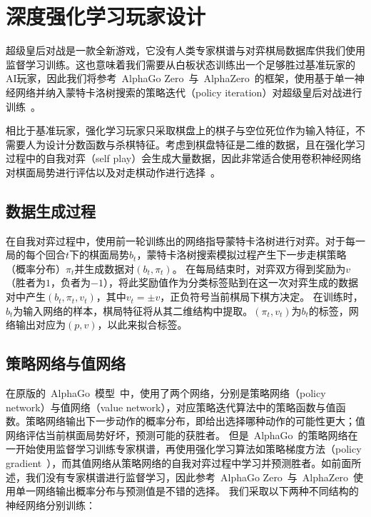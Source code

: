 \section{深度强化学习玩家设计}
超级皇后对战是一款全新游戏，它没有人类专家棋谱与对弈棋局数据库供我们使用监督学习训练。这也意味着我们需要从白板状态训练出一个足够胜过基准玩家的AI玩家，因此我们将参考~AlphaGo Zero~与~AlphaZero~的框架，使用基于单一神经网络并纳入蒙特卡洛树搜索的策略迭代（policy iteration）对超级皇后对战进行训练~\cite{Silver1140,Silver2017,Silver2016}。

相比于基准玩家，强化学习玩家只采取棋盘上的棋子与空位死位作为输入特征，不需要人为设计分数函数与杀棋特征。考虑到棋盘特征是二维的数据，且在强化学习过程中的自我对弈（self play）会生成大量数据，因此非常适合使用卷积神经网络对棋面局势进行评估以及对走棋动作进行选择~\cite{Silver2016}。

\subsection{数据生成过程}
在自我对弈过程中，使用前一轮训练出的网络指导蒙特卡洛树进行对弈。对于每一局的每个回合$t$下的棋面局势$b_{t}$，蒙特卡洛树搜索模拟过程产生下一步走棋策略（概率分布）$\pi_{t}$并生成数据对$(b_{t},\pi_{t})$。
在每局结束时，对弈双方得到奖励为$v$（胜者为$1$，负者为$-1$），将此奖励值作为分类标签贴到在这一次对弈生成的数据对中产生$(b_{t},\pi_{t},v_{t})$，其中$v_{t}=\pm v$，正负符号当前棋局下棋方决定。
在训练时，$b_{t}$为输入网络的样本，棋局特征将从其二维结构中提取。$(\pi_{t},v_{t})$为$b_{t}$的标签，网络输出对应为$(p,v)$，以此来拟合标签。
\subsection{策略网络与值网络}
在原版的~AlphaGo~模型~\cite{Silver2016}中，使用了两个网络，分别是策略网络（policy network）与值网络（value network），对应策略迭代算法中的策略函数与值函数。策略网络输出下一步动作的概率分布，即给出选择哪种动作的可能性更大；值网络评估当前棋面局势好坏，预测可能的获胜者。
但是~AlphaGo~的策略网络在一开始使用监督学习训练专家棋谱，再使用强化学习算法如策略梯度方法（policy gradient~\cite{silver2014deterministic}），而其值网络从策略网络的自我对弈过程中学习并预测胜者。如前面所述，我们没有专家棋谱进行监督学习，因此参考~AlphaGo Zero~与~AlphaZero~使用单一网络输出概率分布与预测值是不错的选择。
我们采取以下两种不同结构的神经网络分别训练：
